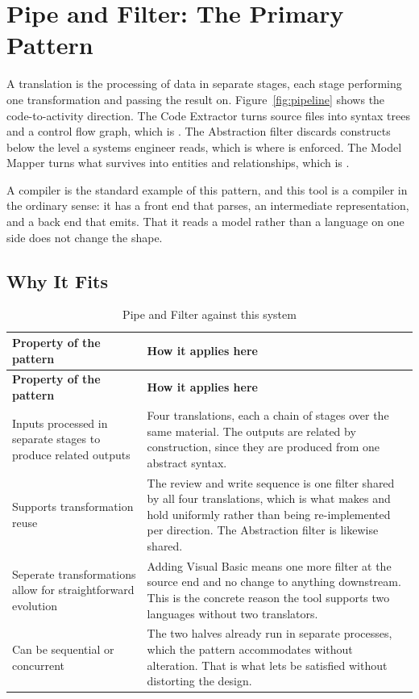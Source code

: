 \section{Pipe and Filter: The Primary Pattern}
\label{sec:pipe-and-filter}


A translation is the processing of data in separate stages, each stage
performing one transformation and passing the result on. Figure~\ref{fig:pipeline}
shows the code-to-activity direction. The Code Extractor turns source files into
syntax trees and a control flow graph, which is . The Abstraction
filter discards constructs below the level a systems engineer reads, which is
where  is enforced. The Model Mapper turns what survives into
entities and relationships, which is .

A compiler is the standard example of this pattern, and this tool is a compiler
in the ordinary sense: it has a front end that parses, an intermediate
representation, and a back end that emits. That it reads a model rather than a language on one side
does not change the shape.

\subsection{Why It Fits}

\begin{longtable}{L{0.34\textwidth}L{0.58\textwidth}}
	\caption{Pipe and Filter against this system}\label{tab:pf-fit}\\
	\toprule
	\textbf{Property of the pattern} & \textbf{How it applies here} \\
	\midrule
	\endfirsthead
	\toprule
	\textbf{Property of the pattern} & \textbf{How it applies here} \\
	\midrule
	\endhead

	Inputs processed in separate stages to produce related outputs &
	Four translations, each a chain of stages over the same material. The
	outputs are related by construction, since they are produced from one
	abstract syntax. \\
	\addlinespace
	Supports transformation reuse & The review and write sequence is one
	filter shared by all four translations, which is what makes  and
	 hold uniformly rather than being re-implemented per direction.
	The Abstraction filter is likewise shared. \\
	\addlinespace
	Seperate transformations allow for straightforward evolution & Adding Visual
	Basic means one more filter at the source end and no change to anything
	downstream. This is the concrete reason the tool supports two languages
	without two translators. \\
	\addlinespace
	Can be sequential or concurrent & The two halves already run in separate
	processes, which the pattern accommodates without alteration. That is what
	lets  be satisfied without distorting the design. \\
	\bottomrule
\end{longtable}


